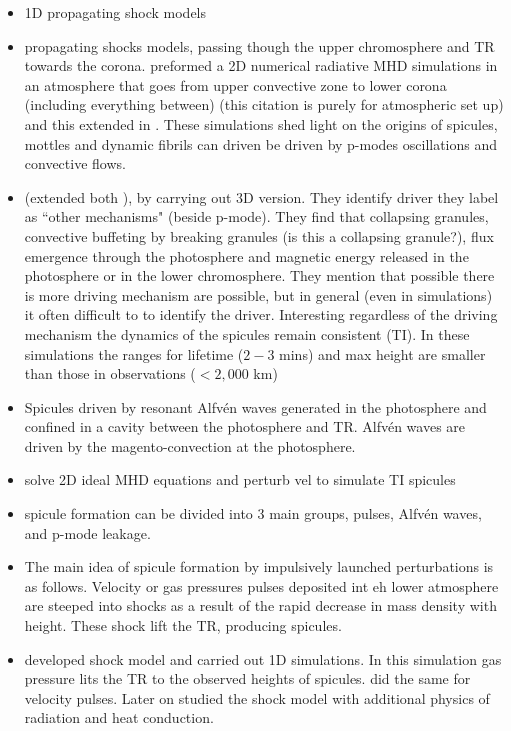 \documentclass[12pt]{ociamthesis}
\newcommand{\Alfven}{Alfv\'{e}n }
\begin{document}
\begin{itemize}
\item 1D propagating shock models \cite{Heggland2007ApJ6661277H,Shibata1982SoPh78333S,Shibata1982}
\item  propagating shocks models, passing though the upper chromosphere and TR towards the corona. \cite{Hansteen2006ApJ} preformed a 2D numerical radiative MHD simulations in an atmosphere that goes from upper convective zone to lower corona (including everything between) \cite{Hansteen2007ASPC368107H} (this citation is purely for atmospheric set up) and this extended in \cite{De_Pontieu2007ApJ}. These simulations shed light on the origins of spicules, mottles and dynamic fibrils can driven be driven by p-modes oscillations and convective flows.
\item \cite{Mart2009ApJ7011569M} (extended both \citep{De_Pontieu2007ApJ,Hansteen2006ApJ}), by carrying out 3D version. They identify driver they label as ``other mechanisms" (beside p-mode). They find that collapsing granules, convective buffeting by breaking granules (is this a collapsing granule?), flux emergence through the photosphere and magnetic energy released in the photosphere or in the lower chromosphere. They mention that possible there is more driving mechanism are possible, but in general (even in simulations) it often difficult to to identify the driver. Interesting regardless of the driving mechanism the dynamics of the spicules remain consistent (TI). In these simulations the ranges for lifetime ($2-3$ mins) and max height are smaller than those in observations ($<2,000$ km)    
\item \cite{Matsumoto2010ApJ7101857M}  Spicules driven by resonant \Alfven waves generated in the photosphere and confined in a cavity between the photosphere and TR. \Alfven waves are driven by the magento-convection at the photosphere. 
\item solve 2D ideal MHD equations and perturb vel to simulate TI spicules \cite{Murawski2010AA519A8M} 
\item \cite{Murawski2010AA519A8M} spicule formation can be divided into 3 main groups, pulses, \Alfven waves, and p-mode leakage. 
\item The main idea of spicule formation by impulsively launched perturbations is as follows. Velocity or gas pressures pulses deposited int eh lower atmosphere are steeped into shocks as a result of the rapid decrease in mass density with height. These shock lift the TR, producing spicules.
\item \cite{Hollweg1982ApJ257345H} developed shock model and carried out 1D simulations. In this simulation gas pressure lits the TR to  the observed heights of spicules. \cite{Suematsu1982SoPh7599S} did the same for velocity pulses. Later on \cite{Heggland2007ApJ6661277H} studied the shock model with additional physics of radiation and heat conduction.

\end{itemize}
\end{document}
